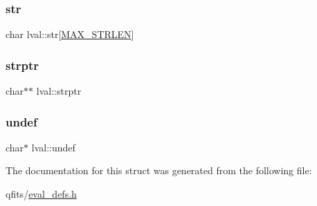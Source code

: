 \mbox{\label{structlval_a704bda3b3b03c2b2562e5907d1546fcb}} 
\subsubsection{\texorpdfstring{str}{str}}
{\footnotesize\ttfamily char lval\+::str\mbox{[}\hyperlink{eval__defs_8h_ae381522e1d10c3730b356f1ac5d2dccb}{M\+A\+X\+\_\+\+S\+T\+R\+L\+EN}\mbox{]}}

\mbox{\label{structlval_a3b6a0197f796fb3f6e04c899a29f2652}} 
\subsubsection{\texorpdfstring{strptr}{strptr}}
{\footnotesize\ttfamily char$\ast$$\ast$ lval\+::strptr}

\mbox{\label{structlval_a99e919cba19f82c5af4cfe3442c28069}} 
\subsubsection{\texorpdfstring{undef}{undef}}
{\footnotesize\ttfamily char$\ast$ lval\+::undef}



The documentation for this struct was generated from the following file\+:\begin{DoxyCompactItemize}
\item 
qfits/\hyperlink{eval__defs_8h}{eval\+\_\+defs.\+h}\end{DoxyCompactItemize}
